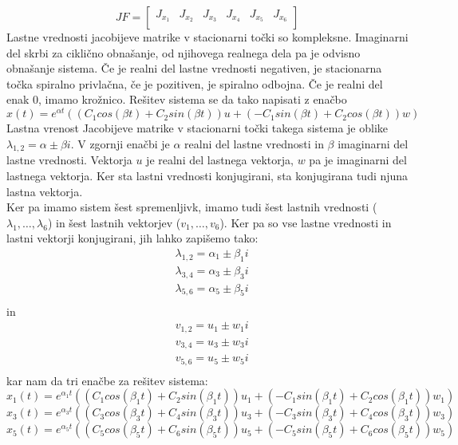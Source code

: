 \documentclass[a4paper, 12pt]{article}
\begin{document}
\begin{equation}
	JF =
	\begin{bmatrix}
		J_{x_{1}} & J_{x_{2}} & J_{x_{3}} & J_{x_{4}} & J_{x_{5}} & J_{x_{6}} \\
	\end{bmatrix}
\end{equation}
Lastne vrednosti jacobijeve matrike v stacionarni točki so kompleksne. Imaginarni del skrbi za ciklično obnašanje, od njihovega realnega dela pa
je odvisno obnašanje sistema. Če je realni del lastne vrednosti negativen, je stacionarna točka
spiralno privlačna, če je pozitiven, je spiralno odbojna. Če je realni del enak $ 0 $, imamo krožnico.
Rešitev sistema se da tako napisati z enačbo
\begin{equation}
	x(t) = e^{\alpha t}((C_{1}cos(\beta t)+C_{2}sin(\beta t))u+(-C_{1}sin(\beta t)+C_{2}cos(\beta t))w)
\end{equation}
Lastna vrenost Jacobijeve matrike v stacionarni točki takega sistema je oblike $ \lambda_{1,2} = \alpha \pm \beta i $.
V zgornji enačbi je $ \alpha $ realni del lastne vrednosti in $ \beta $ imaginarni del lastne vrednosti.
Vektorja $ u $ je realni del lastnega vektorja, $ w $ pa je imaginarni del lastnega vektorja. Ker sta lastni
vrednosti konjugirani, sta konjugirana tudi njuna lastna vektorja.\\
Ker pa imamo sistem šest spremenljivk, imamo tudi šest lastnih vrednosti ($ \lambda_{1}, \dots, \lambda_{6} $) in šest lastnih vektorjev
($ v_{1}, \dots, v_{6} $). Ker pa so vse lastne vrednosti in lastni vektorji konjugirani, jih lahko zapišemo tako:
\begin{align*}
	&\lambda_{1,2} = \alpha_{1} \pm \beta_{1}i \\
	&\lambda_{3,4} = \alpha_{3} \pm \beta_{3}i \\
	&\lambda_{5,6} = \alpha_{5} \pm \beta_{5}i \\
\end{align*}
in
\begin{align*}
	&v_{1,2} = u_{1} \pm w_{1}i \\
	&v_{3,4} = u_{3} \pm w_{3}i \\
	&v_{5,6} = u_{5} \pm w_{5}i \\
\end{align*}
kar nam da tri enačbe za rešitev sistema:
\begin{equation}
	x_{1}(t) = e^{\alpha_{1} t}((C_{1}cos(\beta_{1} t)+C_{2}sin(\beta_{1} t))u_{1}+(-C_{1}sin(\beta_{1} t)+C_{2}cos(\beta_{1} t))w_{1})
\end{equation}
\begin{equation}
	x_{3}(t) = e^{\alpha_{3} t}((C_{3}cos(\beta_{3} t)+C_{4}sin(\beta_{3} t))u_{3}+(-C_{3}sin(\beta_{3} t)+C_{4}cos(\beta_{3} t))w_{3})
\end{equation}
\begin{equation}
	x_{5}(t) = e^{\alpha_{5} t}((C_{5}cos(\beta_{5} t)+C_{6}sin(\beta_{5} t))u_{5}+(-C_{5}sin(\beta_{5} t)+C_{6}cos(\beta_{5} t))w_{5})
\end{equation}
\end{document}
